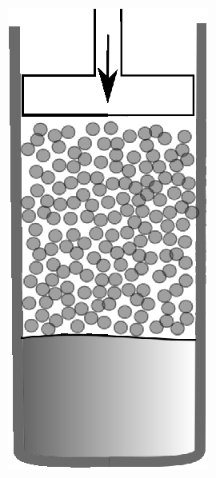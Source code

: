 \documentclass[usenames,dvipsnames]{beamer}
\begin{document}
\begin{frame}
\begin{columns}
\includegraphics[width=0.8\textwidth]{img/proceso/proceso1.eps}



\end{columns}
\end{frame}
\end{document}

